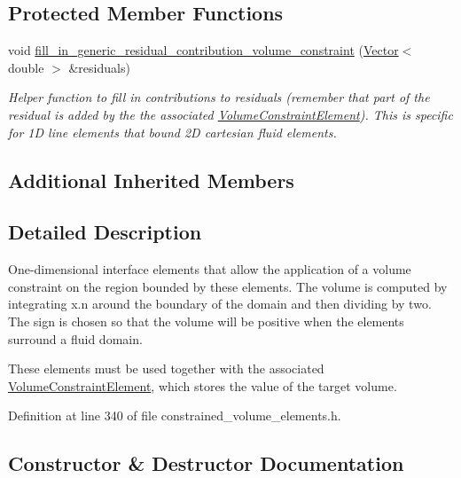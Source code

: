 \subsection*{Protected Member Functions}
\begin{DoxyCompactItemize}
\item 
void \hyperlink{classoomph_1_1LineVolumeConstraintBoundingElement_a03145a064e559d786f730c85000f9fb4}{fill\+\_\+in\+\_\+generic\+\_\+residual\+\_\+contribution\+\_\+volume\+\_\+constraint} (\hyperlink{classoomph_1_1Vector}{Vector}$<$ double $>$ \&residuals)
\begin{DoxyCompactList}\small\item\em Helper function to fill in contributions to residuals (remember that part of the residual is added by the the associated \hyperlink{classoomph_1_1VolumeConstraintElement}{Volume\+Constraint\+Element}). This is specific for 1D line elements that bound 2D cartesian fluid elements. \end{DoxyCompactList}\end{DoxyCompactItemize}
\subsection*{Additional Inherited Members}


\subsection{Detailed Description}
One-\/dimensional interface elements that allow the application of a volume constraint on the region bounded by these elements. The volume is computed by integrating x.\+n around the boundary of the domain and then dividing by two. The sign is chosen so that the volume will be positive when the elements surround a fluid domain.

These elements must be used together with the associated \hyperlink{classoomph_1_1VolumeConstraintElement}{Volume\+Constraint\+Element}, which stores the value of the target volume. 

Definition at line 340 of file constrained\+\_\+volume\+\_\+elements.\+h.



\subsection{Constructor \& Destructor Documentation}
\mbox{\label{classoomph_1_1LineVolumeConstraintBoundingElement_a39baabe26bcf3958b80fe3dd5430c347}} 
